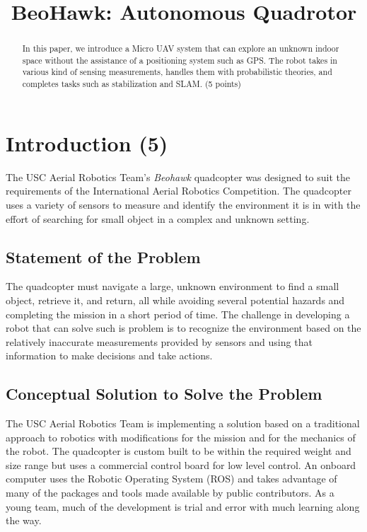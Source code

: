 \documentclass[12pt, letterpaper]{article}
\title{BeoHawk: Autonomous Quadrotor}
\begin{document}
\maketitle
\begin{people}
\end{people}

\begin{abstract}
	In this paper, we introduce a Micro UAV system that can explore an unknown indoor space without the assistance of a positioning system such as GPS. The robot takes in various kind of sensing measurements, handles them with probabilistic theories, and completes tasks such as stabilization and SLAM.  (5 points)
\end{abstract}

\section{Introduction (5)}
The USC Aerial Robotics Team's \textit{Beohawk} quadcopter was designed to suit the requirements of the International Aerial Robotics Competition. The quadcopter uses a variety of sensors to measure and identify the environment it is in with the effort of searching for small object in a complex and unknown setting.

\subsection{Statement of the Problem}
The quadcopter must navigate a large, unknown environment to find a small object, retrieve it, and return, all while avoiding several potential hazards and completing the mission in a short period of time. The challenge in developing a robot that can solve such is problem is to recognize the environment based on the relatively inaccurate measurements provided by sensors and using that information to make decisions and take actions. 

\subsection{Conceptual Solution to Solve the Problem}
The USC Aerial Robotics Team is implementing a solution based on a traditional approach to robotics with modifications for the mission and for the mechanics of the robot. The quadcopter is custom built to be within the required weight and size range but uses a commercial control board for low level control. An onboard computer uses the Robotic Operating System (ROS) and takes advantage of many of the packages and tools made available by public contributors. As a young team, much of the development is trial and error with much learning along the way.
\end{document}
